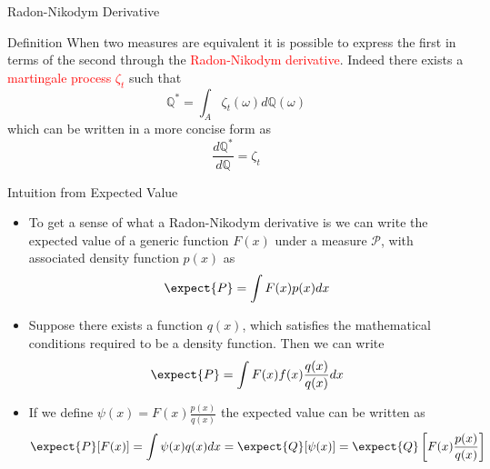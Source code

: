 \documentclass{beamer}
\begin{document}
\begin{frame}{Radon-Nikodym Derivative}
	\begin{block}{Definition}
		When two measures are equivalent it is possible to express the first in terms of the second through the \textcolor{red}{Radon-Nikodym derivative}. Indeed there exists a \textcolor{red}{martingale process $\zeta_t$} such that
		\begin{equation*}
			\mathbb{Q}^* =\int_{A} \zeta_t(\omega)d\mathbb{Q}(\omega)
		\end{equation*}
		which can be written in a more concise form as
		\begin{equation}
			\frac{d\mathbb{Q}^*}{d\mathbb{Q}} = \zeta_t
			\label{eq:radon_nikodym_der}
		\end{equation}
	\end{block}
\end{frame}

\begin{frame}{Intuition from Expected Value}
  \begin{itemize}
  \item To get a sense of what a Radon-Nikodym derivative is we can write the expected value of a generic function $F(x)$ under a measure $\mathcal{P}$, with associated density function $p(x)$ as
    \begin{equation*}
      \expect{P}=\int F(x)p(x)dx
    \end{equation*}
  \item Suppose there exists a function $q(x)$, which satisfies the mathematical conditions required to be a density function. Then we can write
    \begin{equation*}
      \expect{P}=\int F(x)f(x)\frac{q(x)}{q(x)}dx
    \end{equation*}
  \item If we define $\psi(x)=F(x)\frac{p(x)}{q(x)}$ the expected value can be written as 
    \begin{equation*}
      \expect{P}[F(x)]=\int\psi(x)q(x)dx=\expect{Q}[\psi(x)]=\expect{Q}\left[F(x)\frac{p(x)}{q(x)}\right]
    \end{equation*}
  \end{itemize}
\end{frame}
\end{document}
